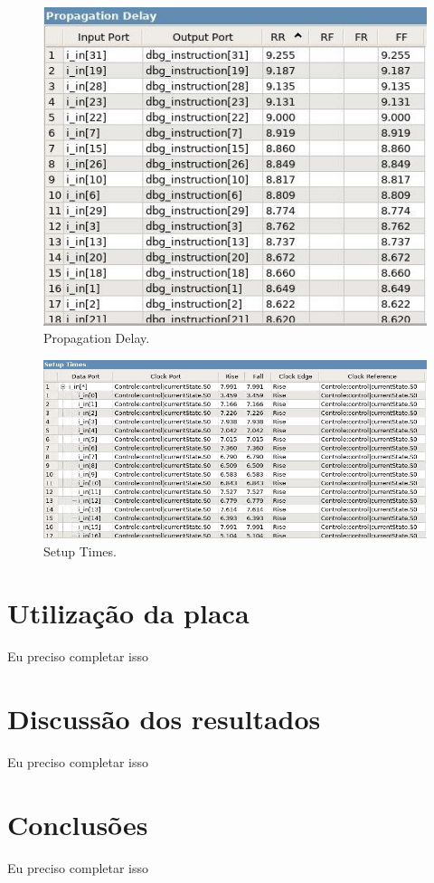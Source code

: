 \documentclass{article}
\begin{document}
        \begin{figure}[H]
            \centering
            \includegraphics[width=\textwidth]{propagation_delay.jpg}
            \caption{Propagation Delay.}
            \label{figura:mips}
        \end{figure}

        \begin{figure}[H]
            \centering
            \includegraphics[width=\textwidth]{setup_times.jpg}
            \caption{Setup Times.}
            \label{figura:mips}
        \end{figure}


    \section{Utilização da placa}

    Eu preciso completar isso

    \section{Discussão dos resultados}

    Eu preciso completar isso

    \section{Conclusões}

    Eu preciso completar isso
\end{document}
